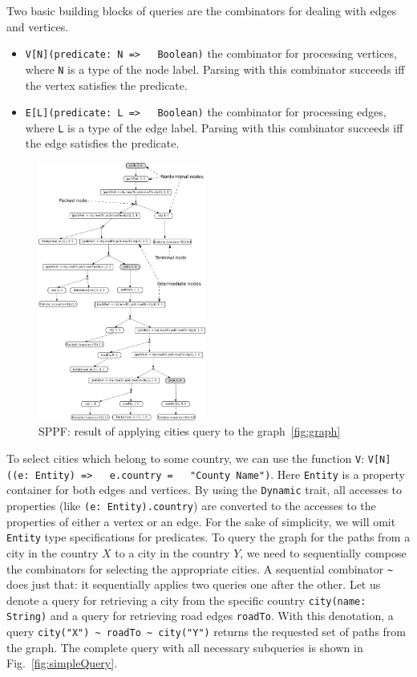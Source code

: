 Two basic building blocks of queries are the combinators for dealing with edges and vertices.
\begin{itemize}
    \item \lstinline{V[N](predicate: N =>   Boolean)} the combinator for processing vertices, where \lstinline{N} is a type of the node label.
    Parsing with this combinator succeeds iff the vertex satisfies the predicate.
    \item \lstinline{E[L](predicate: L =>   Boolean)} the combinator for processing edges, where \lstinline{L} is a type of the edge label.
    Parsing with this combinator succeeds iff the edge satisfies the predicate.
\end{itemize}

\begin{figure}[h]
\includegraphics[width=0.49\textwidth]{sppf}
\caption{SPPF: result of applying cities query to the graph~\ref{fig:graph}}
\label{fig:sppf}
\end{figure}

To select cities which belong to some country, we can use the function \lstinline{V}: \lstinline{V[N]((e: Entity) =>   e.country =   "County Name")}.
Here \lstinline{Entity} is a property container for both edges and vertices.
By using the \lstinline{Dynamic} trait, all accesses to properties (like \lstinline{(e: Entity).country}) are converted to the accesses to the properties of either a vertex or an edge.
For the sake of simplicity, we will omit \lstinline{Entity} type specifications for predicates.
To query the graph for the paths from a city in the country $X$ to a city in the country $Y$, we need to sequentially compose the combinators for selecting the appropriate cities.
A sequential combinator \lstinline{~} does just that: it sequentially  applies two queries one after the other.
Let us denote a query for retrieving a city from the specific country \lstinline{city(name: String)} and a query for retrieving road edges \lstinline{roadTo}.
With this denotation, a query \lstinline{city("X") ~ roadTo ~ city("Y")} returns the requested set of paths from the graph.
The complete query with all necessary subqueries is shown in Fig.~\ref{fig:simpleQuery}.

